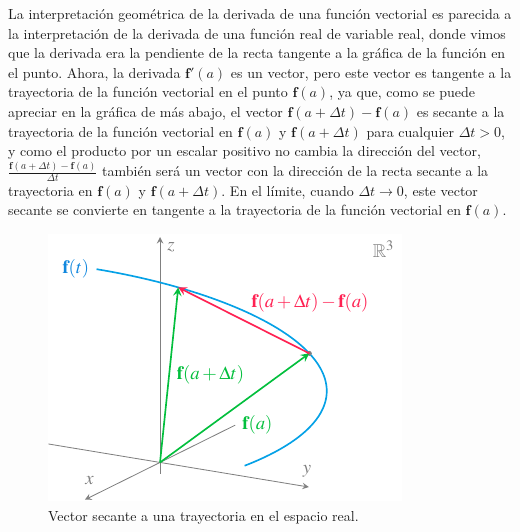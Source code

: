 \documentclass[
  a4paper,
]{scrreport}
\theoremstyle{definition}
\theoremstyle{plain}
\theoremstyle{definition}
\theoremstyle{definition}
\theoremstyle{plain}
\theoremstyle{plain}
\theoremstyle{remark}
\begin{document}
La interpretación geométrica de la derivada de una función vectorial es
parecida a la interpretación de la derivada de una función real de
variable real, donde vimos que la derivada era la pendiente de la recta
tangente a la gráfica de la función en el punto. Ahora, la derivada
\(\mathbf{f}'(a)\) es un vector, pero este vector es tangente a la
trayectoria de la función vectorial en el punto \(\mathbf{f}(a)\), ya
que, como se puede apreciar en la gráfica de más abajo, el vector
\(\mathbf{f}(a+\Delta t)-\mathbf{f}(a)\) es secante a la trayectoria de
la función vectorial en \(\mathbf{f}(a)\) y \(\mathbf{f}(a+\Delta t)\)
para cualquier \(\Delta t>0\), y como el producto por un escalar
positivo no cambia la dirección del vector,
\(\frac{\mathbf{f}(a+\Delta t)-\mathbf{f}(a)}{\Delta t}\) también será
un vector con la dirección de la recta secante a la trayectoria en
\(\mathbf{f}(a)\) y \(\mathbf{f}(a+\Delta t)\). En el límite, cuando
\(\Delta t \to 0\), este vector secante se convierte en tangente a la
trayectoria de la función vectorial en \(\mathbf{f}(a)\).

\begin{figure}[H]

{\centering \includegraphics{img/funciones-vectoriales/derivada-vectorial-secante.pdf}

}

\caption{Vector secante a una trayectoria en el espacio real.}

\end{figure}%
\end{document}
